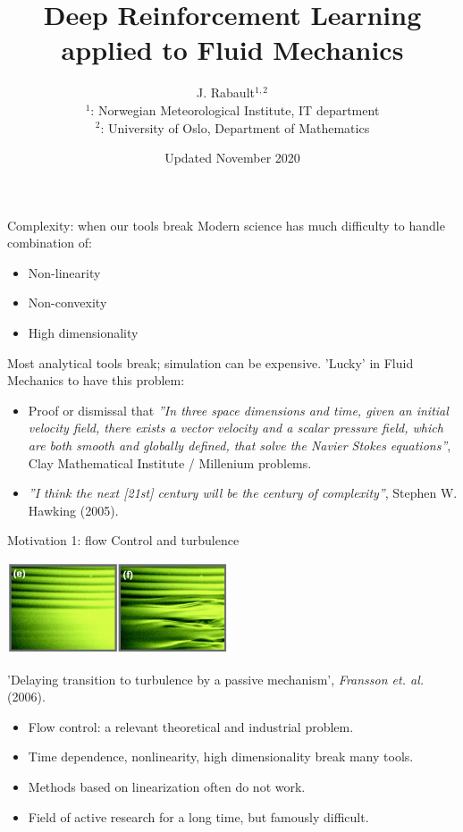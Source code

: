 \documentclass{beamer}
\title[DRL in FM]{Deep Reinforcement Learning \\ applied to Fluid Mechanics}
\author[J. Rabault]{J. Rabault$^{1,2}$ \\
$^{1}$: Norwegian Meteorological Institute, IT department \\
$^{2}$: University of Oslo, Department of Mathematics \\
}
\date{Updated November 2020}
\institute[]{}
\begin{document}
\maketitle

\begin{frame}{Complexity: when our tools break}
  Modern science has much difficulty to handle combination of:
  \begin{itemize}
    \item Non-linearity
    \item Non-convexity
    \item High dimensionality
  \end{itemize}

  Most analytical tools break; simulation can be expensive. 'Lucky' in Fluid Mechanics to have this problem:
  
  \begin{itemize}
    \item Proof or dismissal that \textit{''In three space dimensions and time, given an initial velocity field, there exists a vector velocity and a scalar pressure field, which are both smooth and globally defined, that solve the Navier Stokes equations''}, Clay Mathematical Institute / Millenium problems.
    \item \textit{''I think the next [21st] century will be the century of complexity''}, Stephen W. Hawking (2005).
  \end{itemize}
\end{frame}


\begin{frame}{Motivation 1: flow Control and turbulence}
  \begin{center}
    \includegraphics[width=0.49\textwidth]{./Figures/example_delay_turbulence}
  \end{center}
  \vspace{-0.5cm}
  \begin{center}
  {\tiny 'Delaying transition to turbulence by a passive mechanism', \textit{Fransson et. al.} (2006).}
  \end{center}

    \begin{itemize}
      \item Flow control: a relevant theoretical and industrial problem.
      \item Time dependence, nonlinearity, high dimensionality break many tools.
      \item Methods based on linearization often do not work.
      \item Field of active research for a long time, but famously difficult. \\~\\
    \end{itemize}
\end{frame}
\end{document}
